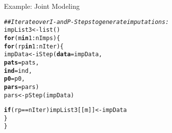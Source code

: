 \documentclass{beamer}\usepackage[]{graphicx}\usepackage[]{color}
\makeatletter
\newcommand{\hlnum}[1]{\textcolor[rgb]{0.69,0.494,0}{#1}}%
\newcommand{\hlcom}[1]{\textcolor[rgb]{0.514,0.506,0.514}{\textit{#1}}}%
\newcommand{\hlopt}[1]{\textcolor[rgb]{0,0,0}{#1}}%
\newcommand{\hlstd}[1]{\textcolor[rgb]{0,0,0}{#1}}%
\newcommand{\hlkwa}[1]{\textcolor[rgb]{0,0,0}{\textbf{#1}}}%
\newcommand{\hlkwb}[1]{\textcolor[rgb]{0,0.341,0.682}{#1}}%
\newcommand{\hlkwc}[1]{\textcolor[rgb]{0,0,0}{\textbf{#1}}}%
\newcommand{\hlkwd}[1]{\textcolor[rgb]{0.004,0.004,0.506}{#1}}%
\newenvironment{kframe}{%
 \def\at@end@of@kframe{}%
 \ifinner\ifhmode%
  \def\at@end@of@kframe{\end{minipage}}%
  \begin{minipage}{\columnwidth}%
 \fi\fi%
 \def\FrameCommand##1{\hskip\@totalleftmargin \hskip-\fboxsep
 \colorbox{shadecolor}{##1}\hskip-\fboxsep
     \hskip-\linewidth \hskip-\@totalleftmargin \hskip\columnwidth}%
 \MakeFramed {\advance\hsize-\width
   \@totalleftmargin\z@ \linewidth\hsize
   \@setminipage}}%
 {\par\unskip\endMakeFramed%
 \at@end@of@kframe}
\newenvironment{knitrout}{}{} %
\makeatother
\begin{document}

\begin{frame}[fragile]{Example: Joint Modeling}

\begin{knitrout}\footnotesize
{}\color{fgcolor}\begin{kframe}
\begin{alltt}
\hlcom{## Iterate over I- and P-Steps to generate imputations:}
\hlstd{impList3} \hlkwb{<-} \hlkwd{list}\hlstd{()}
\hlkwa{for}\hlstd{(m} \hlkwa{in} \hlnum{1} \hlopt{:} \hlstd{nImps) \{}
    \hlkwa{for}\hlstd{(rp} \hlkwa{in} \hlnum{1} \hlopt{:} \hlstd{nIter) \{}
        \hlstd{impData} \hlkwb{<-} \hlkwd{iStep}\hlstd{(}\hlkwc{data} \hlstd{= impData,}
                         \hlkwc{pats} \hlstd{= pats,}
                         \hlkwc{ind}  \hlstd{= ind,}
                         \hlkwc{p0}   \hlstd{= p0,}
                         \hlkwc{pars} \hlstd{= pars)}
        \hlstd{pars} \hlkwb{<-} \hlkwd{pStep}\hlstd{(impData)}

        \hlkwa{if}\hlstd{(rp} \hlopt{==} \hlstd{nIter) impList3[[m]]} \hlkwb{<-} \hlstd{impData}
    \hlstd{\}}
\hlstd{\}}
\end{alltt}
\end{kframe}
\end{knitrout}

\end{frame}

\end{document}
